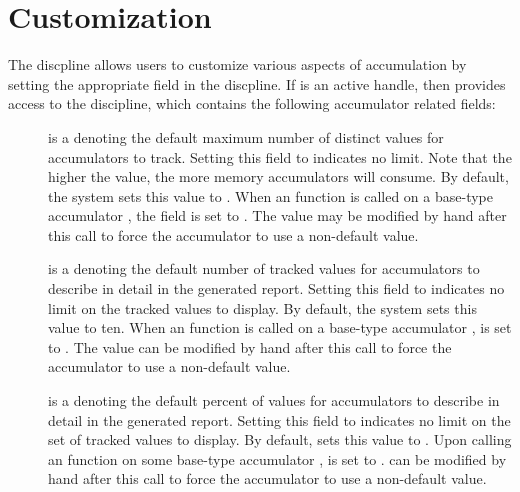 \section{Customization}
\label{sec:accumulators-customization}
The \pads{} discpline allows users to customize various aspects of
accumulation by setting the appropriate field in the discpline.  If
 is an active \pads{} handle, then  provides
access to the discipline, which contains the following accumulator
related fields: 

\begin{description}
\item[] is a  denoting the default maximum number of distinct values
   for accumulators to track. Setting this field to 
   indicates no limit. Note that the higher the value, the more memory
   accumulators will consume.  By default, the \pads{} system sets
   this value to . When an  function is
   called on a base-type accumulator , the field
    is set to .
   The value  may be modified by hand after this call
   to force the accumulator  to use a non-default value.

\item[] is a  denoting the default number of tracked values for
  accumulators to describe in detail in the generated report. Setting
  this field to  indicates no limit on the tracked values
  to display. By default, the \pads{} system sets this value to
  ten. When an  function is called on a 
  base-type accumulator ,  is set to
  . The value  can be 
  modified by hand after this call to force the accumulator  to
  use a non-default value. 

\item[] is a  denoting the default percent of values for
  accumulators to describe in detail in the generated report. Setting this field to 
  indicates no limit on the set of tracked values to display.  By
  default, \pads{} sets this value to .
  Upon calling an  function on some base-type accumulator ,
   is set to .
   can be modified by hand after this call to force
  the accumulator  to use a non-default value. 

\end{description}

